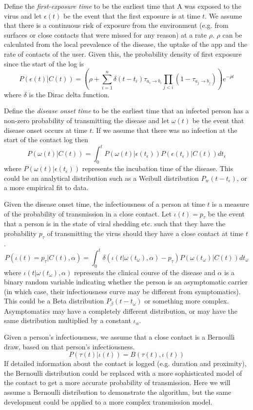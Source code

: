 \documentclass{article}
\begin{document}
Define the \textit{first-exposure time} to be the earliest time that A was exposed to the virus and let $\epsilon(t)$ be the event that the first exposure is at time $t$. We assume that there is a continuous risk of exposure from the environment (e.g. from surfaces or close contacts that were missed for any reason) at a rate $\rho$. $\rho$ can be calculated from the local prevalence of the disease, the uptake of the app and the rate of contacts of the user. Given this, the probability density of first exposure since the start of the log is
\[
P\left(\epsilon(t)|C(t)\right) = \left(\rho + \sum_{i=1}^n \delta(t - t_i)\tau_{a_i\rightarrow b_i} \prod_{j<i}(1-\tau_{a_j\rightarrow b_j})\right) e^{-\rho t}
\] 
where $\delta$ is the Dirac delta function.

Define the \textit{disease onset time} to be the earliest time that an infected person has a non-zero probability of transmitting the disease and let $\omega(t)$ be the event that disease onset occurs at time $t$. If we assume that there was no infection at the start of the contact log then
\[
P(\omega(t)|C(t)) = \int_0^{t} P(\omega(t)|\epsilon(t_\epsilon))P(\epsilon(t_\epsilon)|C(t)) dt_\epsilon
\]
where $P(\omega(t)|\epsilon(t_\epsilon))$ represents the incubation time of the disease. This could be an analytical distribution such as a Weibull distribution $P_w(t-t_\epsilon)$, or a more empirical fit to data.

Given the disease onset time, the infectiousness of a person at time $t$ is a measure of the probability of transmission in a close contact. Let $\iota(t) = p_\tau$ be the event that a person is in the state of viral shedding etc. such that they have the probability $p_\tau$ of transmitting the virus should they have a close contact at time $t$.
\[
P(\iota(t) = p_\tau|C(t),\alpha) = \int_0^t \delta(\iota(t|\omega(t_\omega),\alpha)-p_\tau)P(\omega(t_\omega)|C(t)) dt_\omega
\]
where $\iota(t|\omega(t_\omega),\alpha)$ represents the clinical course of the disease and $\alpha$ is a binary random variable indicating whether the person is an asymptomatic carrier (in which case, their infectiousness curve may be different from symptomatics). This could be a Beta distribution $P_\beta(t-t_\omega)$ or something more complex. Asymptomatics may have a completely different distribution, or may have the same distribution multiplied by a constant $\iota_\alpha$.

Given a person's infectiousness, we assume that a close contact is a Bernoulli draw, based on that person's infectiousness.
\[
P(\tau(t)|\iota(t)) = B(\tau(t), \iota(t))
\]
If detailed information about the contact is logged (e.g. duration and proximity), the Bernoulli distribution could be replaced with a more sophisticated model of the contact to get a more accurate probability of transmission. Here we will assume a Bernoulli distribution to demonstrate the algorithm, but the same development could be applied to a more complex transmission model.
\end{document}
